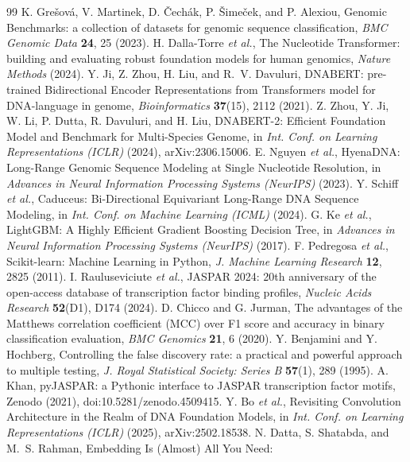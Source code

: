 \documentclass{ws-procs11x85}
\begin{document}
\begin{thebibliography}{99}
 K. Gre\v{s}ov\'{a}, V. Martinek, D. \v{C}ech\'{a}k, P. \v{S}ime\v{c}ek, and P. Alexiou,
Genomic Benchmarks: a collection of datasets for genomic sequence classification, {\it BMC Genomic Data}
{\bf 24}, 25 (2023).
 H. Dalla-Torre {\it et al.}, The Nucleotide Transformer: building and evaluating robust
foundation models for human genomics, {\it Nature Methods} (2024).
 Y. Ji, Z. Zhou, H. Liu, and R.~V. Davuluri, DNABERT: pre-trained Bidirectional Encoder
Representations from Transformers model for DNA-language in genome, {\it Bioinformatics} {\bf 37}(15),
2112 (2021).
 Z. Zhou, Y. Ji, W. Li, P. Dutta, R. Davuluri, and H. Liu, DNABERT-2: Efficient
Foundation Model and Benchmark for Multi-Species Genome, in {\it Int. Conf. on Learning Representations
(ICLR)} (2024), arXiv:2306.15006.
 E. Nguyen {\it et al.}, HyenaDNA: Long-Range Genomic Sequence Modeling at Single
Nucleotide Resolution, in {\it Advances in Neural Information Processing Systems (NeurIPS)} (2023).
 Y. Schiff {\it et al.}, Caduceus: Bi-Directional Equivariant Long-Range DNA Sequence
Modeling, in {\it Int. Conf. on Machine Learning (ICML)} (2024).
 G. Ke {\it et al.}, LightGBM: A Highly Efficient Gradient Boosting Decision Tree, in
{\it Advances in Neural Information Processing Systems (NeurIPS)} (2017).
 F. Pedregosa {\it et al.}, Scikit-learn: Machine Learning in Python, {\it J. Machine
Learning Research} {\bf 12}, 2825 (2011).
 I. Rauluseviciute {\it et al.}, JASPAR 2024: 20th anniversary of the open-access database
of transcription factor binding profiles, {\it Nucleic Acids Research} {\bf 52}(D1), D174 (2024).
 D. Chicco and G. Jurman, The advantages of the Matthews correlation coefficient (MCC) over
F1 score and accuracy in binary classification evaluation, {\it BMC Genomics} {\bf 21}, 6 (2020).
 Y. Benjamini and Y. Hochberg, Controlling the false discovery rate: a practical and powerful
approach to multiple testing, {\it J. Royal Statistical Society: Series B} {\bf 57}(1), 289 (1995).
 A. Khan, pyJASPAR: a Pythonic interface to JASPAR transcription factor motifs, Zenodo
(2021), doi:10.5281/zenodo.4509415.
 Y. Bo {\it et al.}, Revisiting Convolution Architecture in the Realm of DNA Foundation
Models, in {\it Int. Conf. on Learning Representations (ICLR)} (2025), arXiv:2502.18538.
 N. Datta, S. Shatabda, and M.~S. Rahman, Embedding Is (Almost) All You Need:

\end{thebibliography}
\end{document}
